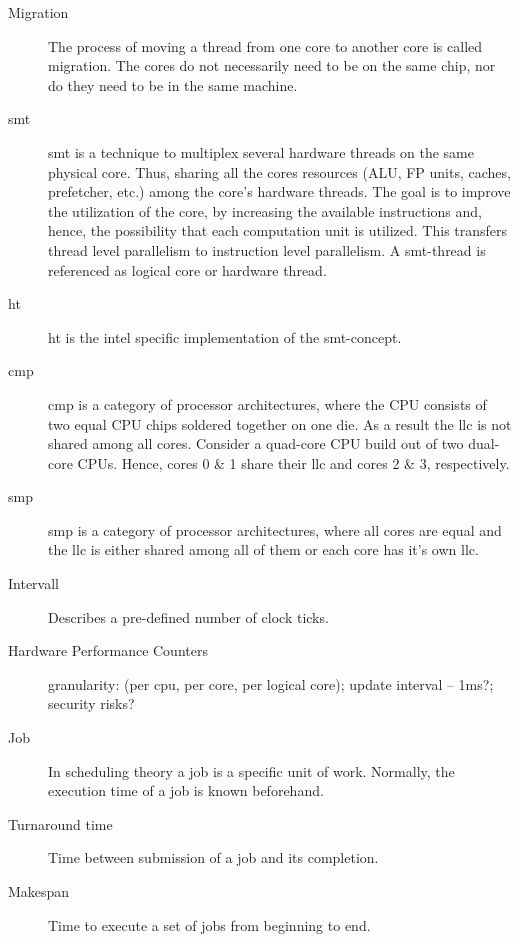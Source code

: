 \begin{description}
  \item[Migration] The process of moving a thread from one core to another core
    is called migration.
    The cores do not necessarily need to be on the same chip, nor do they need
    to be in the same machine.

  \item[\Gls{smt}] \gls{smt} is a technique to multiplex several hardware
    threads on the same physical core.
    Thus, sharing all the cores resources (ALU, FP units, caches, prefetcher,
    etc.) among the core's hardware threads.
    The goal is to improve the utilization of the core, by increasing the
    available instructions and, hence, the possibility that each computation
    unit is utilized.
    This transfers thread level parallelism to instruction level parallelism.
    A \gls{smt}-thread is referenced as logical core or hardware thread.

  \item[\Gls{ht}] \gls{ht} is the \gls{intel} specific implementation of the
    \gls{smt}-concept.

  \item[\Gls{cmp}] \gls{cmp} is a category of processor architectures, where
    the CPU consists of two equal CPU chips soldered together on one die.
    As a result the \gls{llc} is not shared among all cores.
    Consider a quad-core CPU build out of two dual-core CPUs.
    Hence, cores 0 \& 1 share their \gls{llc} and cores 2 \& 3, respectively.

  \item[\Gls{smp}] \gls{smp} is a category of processor architectures, where
    all cores are equal and the \gls{llc} is either shared among all of them or
    each core has it's own \gls{llc}.

  \item[Intervall] Describes a pre-defined number of clock ticks.

  \item[Hardware Performance Counters]  granularity: (per
    cpu, per core, per logical core);
    update interval -- 1ms?;
    security risks?

  \item[Job] In scheduling theory a job is a specific unit of work. Normally,
    the execution time of a job is known beforehand.

  \item[Turnaround time] Time between submission of a job and its completion.

  \item[Makespan] Time to execute a set of jobs from beginning to end.




\end{description}

